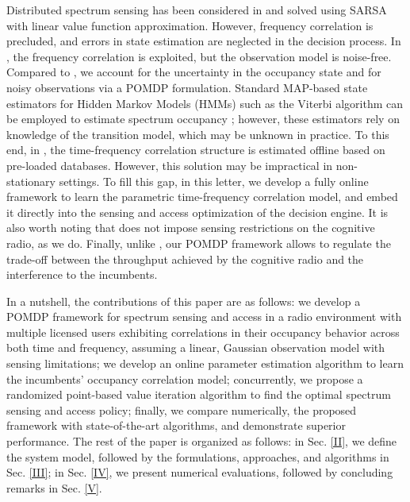 \documentclass[10pt,twocolumn]{IEEEtran}
\begin{document}
Distributed spectrum sensing has been considered in \cite{6507570} and solved using SARSA with linear value function approximation. However, frequency correlation is precluded, and errors in state estimation are neglected in the decision process. In \cite{6956794}, the frequency correlation is exploited, but the observation model is noise-free. Compared to \cite{6507570, 6956794}, we account for the uncertainty in the occupancy state and for noisy observations via a POMDP formulation. Standard MAP-based state estimators for Hidden Markov Models (HMMs) such as the Viterbi algorithm can be employed to estimate spectrum occupancy \cite{4554696}; however, these estimators rely on knowledge of the transition model, which may be unknown in practice. To this end, in \cite{6956794, 4554696}, the time-frequency correlation structure is estimated offline based on pre-loaded databases. However, this solution may be impractical in non-stationary settings. To fill this gap, in this letter, we develop a fully online framework  to learn the parametric time-frequency correlation model, and embed it directly into the sensing and access optimization of the decision engine. It is also worth noting that \cite{4554696} does not impose sensing restrictions on the cognitive radio, as we do. Finally, unlike \cite{7094730, 6507570, 4554696, 6956794}, our POMDP framework allows to regulate the trade-off between the throughput achieved by the cognitive radio and the interference to the incumbents.

In a nutshell, the contributions of this paper are as follows:
we develop a POMDP framework for spectrum sensing and access in a radio environment with multiple licensed users exhibiting correlations in their occupancy behavior across both time and frequency, assuming a linear, Gaussian observation model with sensing limitations; we develop an online parameter estimation algorithm to learn the incumbents' occupancy correlation model; 
concurrently, we propose a randomized point-based value iteration algorithm to find the optimal spectrum sensing and access policy; finally, we compare numerically, the proposed framework with state-of-the-art algorithms, and demonstrate superior performance. The rest of the paper is organized as follows: in Sec. \ref{II}, we define the system model, followed by the formulations, approaches, and algorithms in Sec. \ref{III}; in Sec. \ref{IV}, we present numerical evaluations, followed by concluding remarks in Sec. \ref{V}.
\vspace{-4mm}
\end{document}
